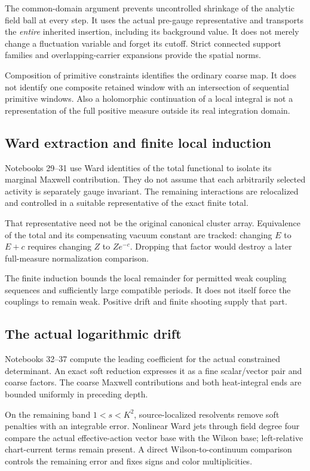 \documentclass[11pt]{article}
\theoremstyle{remark}
\begin{document}
The common-domain argument prevents uncontrolled shrinkage of
the analytic field ball at every step. It uses the actual
pre-gauge representative and transports the \emph{entire}
inherited insertion, including its background value.
It does not merely change a fluctuation variable and forget
its cutoff. Strict connected support families and
overlapping-carrier expansions provide the spatial norms.

Composition of primitive constraints identifies the ordinary
coarse map. It does not identify one composite retained window
with an intersection of sequential primitive windows. Also a
holomorphic continuation of a local integral is not a
representation of the full positive measure outside its
real integration domain.

\subsection{Ward extraction and finite local induction}

Notebooks 29--31 use Ward identities of the total functional
to isolate its marginal Maxwell contribution. They do not
assume that each arbitrarily selected activity is separately
gauge invariant. The remaining interactions are relocalized
and controlled in a suitable representative of the exact
finite total.

That representative need not be the original canonical cluster
array. Equivalence of the total and its compensating vacuum
constant are tracked: changing \(E\) to \(E+c\) requires
changing \(Z\) to \(Ze^{-c}\). Dropping that factor would
destroy a later full-measure normalization comparison.

The finite induction bounds the local remainder for permitted
weak coupling sequences and sufficiently large compatible
periods. It does not itself force the couplings to remain
weak. Positive drift and finite shooting supply that part.

\subsection{The actual logarithmic drift}

Notebooks 32--37 compute the leading coefficient for the
actual constrained determinant. An exact soft reduction
expresses it as a fine scalar/vector pair and coarse factors.
The coarse Maxwell contributions and both heat-integral ends
are bounded uniformly in preceding depth.

On the remaining band \(1<s<K^2\), source-localized resolvents
remove soft penalties with an integrable error. Nonlinear
Ward jets through field degree four compare the actual
effective-action vector base with the Wilson base;
left-relative chart-current terms remain present.
A direct Wilson-to-continuum comparison controls the
remaining error and fixes signs and color multiplicities.
\end{document}
